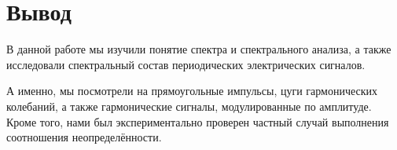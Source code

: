 \documentclass[a4paper,12pt]{article}
\begin{document}

















\newpage


\section*{Вывод}
В данной работе мы изучили понятие спектра и спектрального анализа, а также исследовали спектральный состав периодических электрических сигналов.

А именно, мы посмотрели на прямоугольные импульсы, цуги гармонических колебаний, а также гармонические сигналы, модулированные по амплитуде. Кроме того, нами был экспериментально проверен частный случай выполнения соотношения неопределённости.
\end{document}
